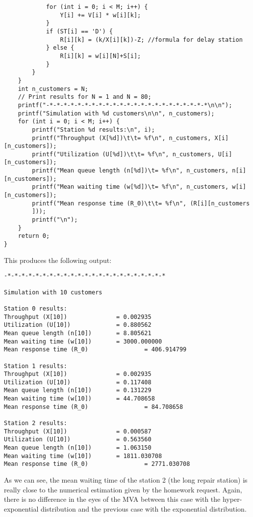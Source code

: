 \documentclass[12pt]{article}
\begin{document}
\begin{lstlisting}
			for (int i = 0; i < M; i++) {
				Y[i] += V[i] * w[i][k];
			}
			if (ST[i] == 'D') {
				R[i][k] = (k/X[i][k])-Z; //formula for delay station
			} else {
				R[i][k] = w[i][N]+S[i];
			}
		}
	}
	int n_customers = N;
	// Print results for N = 1 and N = 80;
	printf("-*-*-*-*-*-*-*-*-*-*-*-*-*-*-*-*-*-*-*-*-*-*-*\n\n");
	printf("Simulation with %d customers\n\n", n_customers);
	for (int i = 0; i < M; i++) {
		printf("Station %d results:\n", i);
		printf("Throughput (X[%d])\t\t= %f\n", n_customers, X[i][n_customers]);
		printf("Utilization (U[%d])\t\t= %f\n", n_customers, U[i][n_customers]);
		printf("Mean queue length (n[%d])\t= %f\n", n_customers, n[i][n_customers]);
		printf("Mean waiting time (w[%d])\t= %f\n", n_customers, w[i][n_customers]);
		printf("Mean response time (R_0)\t\t= %f\n", (R[i][n_customers
		])); 
		printf("\n");
	}
	return 0;
}
\end{lstlisting} 
This produces the following output:
\begin{verbatim}
-*-*-*-*-*-*-*-*-*-*-*-*-*-*-*-*-*-*-*-*-*-*-*

Simulation with 10 customers

Station 0 results:
Throughput (X[10])              = 0.002935
Utilization (U[10])             = 0.880562
Mean queue length (n[10])       = 8.805621
Mean waiting time (w[10])       = 3000.000000
Mean response time (R_0)                = 406.914799

Station 1 results:
Throughput (X[10])              = 0.002935
Utilization (U[10])             = 0.117408
Mean queue length (n[10])       = 0.131229
Mean waiting time (w[10])       = 44.708658
Mean response time (R_0)                = 84.708658

Station 2 results:
Throughput (X[10])              = 0.000587
Utilization (U[10])             = 0.563560
Mean queue length (n[10])       = 1.063150
Mean waiting time (w[10])       = 1811.030708
Mean response time (R_0)                = 2771.030708
\end{verbatim}
As we can see, the mean waiting time of the station 2 (the long repair station) is really close to the numerical estimation given by the homework request. Again, there is no difference in the eyes of the MVA between this case with the hyper-exponential distribution and the previous case with the exponential distribution.
\end{document}

